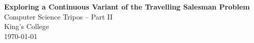 \pagestyle{empty}


\vspace*{60mm}
\begin{center}
  \Huge
  \textbf{Exploring a Continuous Variant of the Travelling Salesman Problem} \\[5mm]
  Computer Science Tripos -- Part II \\[5mm]
  King's College \\[5mm]
  \today  %
\end{center}
